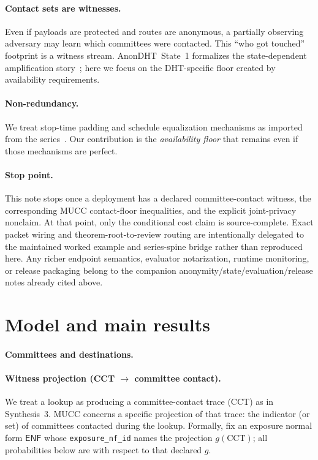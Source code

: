 \documentclass[11pt]{article}
\begin{document}
\paragraph{Contact sets are witnesses.}
Even if payloads are protected and routes are anonymous, a partially observing adversary may learn which committees were contacted.
This ``who got touched'' footprint is a witness stream.
AnonDHT~State~1 formalizes the state-dependent amplification story~\cite{series:state1}; here we focus on the DHT-specific floor created by availability requirements.


\paragraph{Non-redundancy.}
We treat stop-time padding and schedule equalization mechanisms as imported from the series~\cite{series:stoptimeaddendum,series:schedcompiler}.
Our contribution is the \emph{availability floor} that remains even if those mechanisms are perfect.

\paragraph{Stop point.}
This note stops once a deployment has a declared committee-contact witness, the corresponding MUCC contact-floor inequalities, and the explicit joint-privacy nonclaim. At that point, only the conditional cost claim is source-complete. Exact packet wiring and theorem-root-to-review routing are intentionally delegated to the maintained worked example and series-spine bridge rather than reproduced here. Any richer endpoint semantics, evaluator notarization, runtime monitoring, or release packaging belong to the companion anonymity/state/evaluation/release notes already cited above.\cite{series:workedexample,series:seriesspines,series:oddsinflation,series:profiling,series:state3,series:evalnotary,series:release}


\section{Model and main results}
\label{sec:model}

\paragraph{Committees and destinations.}

\paragraph{Witness projection (CCT $\rightarrow$ committee contact).}
We treat a lookup as producing a committee-contact trace (CCT) as in Synthesis~3.
MUCC concerns a specific projection of that trace: the indicator (or set) of committees contacted during the lookup.
Formally, fix an exposure normal form \(\mathsf{ENF}\) whose \texttt{exposure\_nf\_id} names the projection \(g(\mathrm{CCT})\); all probabilities below are with respect to that declared \(g\).
\end{document}

